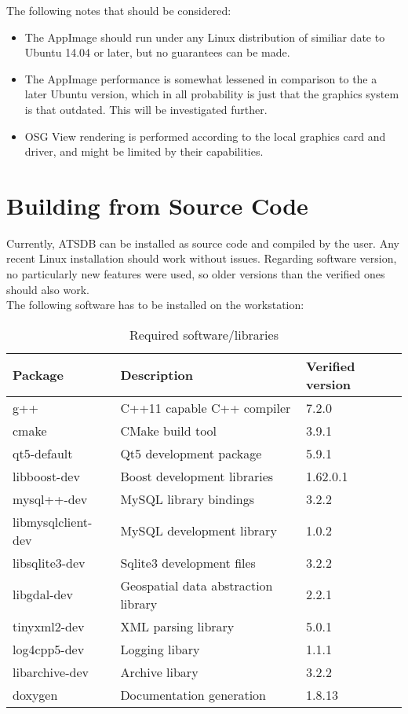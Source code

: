 The following notes that should be considered:

\begin{itemize}  
\item The AppImage should run under any Linux distribution of similiar date to Ubuntu 14.04 or later, but no guarantees can be made.
\item The AppImage performance is somewhat lessened in comparison to the a later Ubuntu version, which in all probability is just that the graphics system is that outdated. This will be investigated further.
\item OSG View rendering is performed according to the local graphics card and driver, and might be limited by their capabilities.
\end{itemize}

\section{Building from Source Code}
Currently, ATSDB can be installed as source code and compiled by the user. Any recent Linux installation should work without issues. Regarding software version, no particularly new features were used, so older versions than the verified ones should also work. \\

The following software has to be installed on the workstation:

\begin{table}[H]
  \center
  \begin{tabular}{ | l | l | l |}
    \hline
    \textbf{Package} & \textbf{Description} & \textbf{Verified version} \\ \hline
    g++ & C++11 capable C++ compiler & 7.2.0 \\ \hline
    cmake & CMake build tool & 3.9.1 \\ \hline
    qt5-default & Qt5 development package & 5.9.1 \\ \hline
    libboost-dev & Boost development libraries & 1.62.0.1 \\ \hline
    mysql++-dev & MySQL library bindings & 3.2.2 \\ \hline
    libmysqlclient-dev & MySQL development library & 1.0.2 \\ \hline
    libsqlite3-dev & Sqlite3 development files & 3.2.2 \\ \hline
    libgdal-dev & Geospatial data abstraction library & 2.2.1 \\ \hline
    tinyxml2-dev & XML parsing library & 5.0.1 \\ \hline
    log4cpp5-dev & Logging libary & 1.1.1 \\ \hline
    libarchive-dev & Archive libary & 3.2.2 \\ \hline
    doxygen & Documentation generation & 1.8.13 \\ 
    \hline
  \end{tabular}
  \caption{Required software/libraries}
\end{table}

